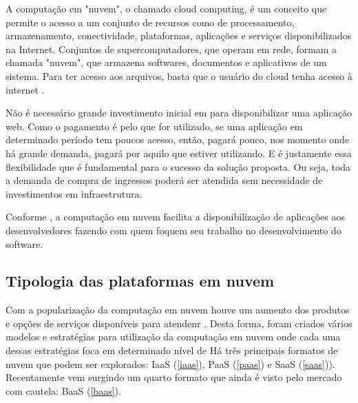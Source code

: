 \begin{citacao}
A computação em "nuvem", o chamado cloud computing, é um conceito que permite o acesso a
um conjunto de recursos como de processamento, armazenamento, conectividade, plataformas,
aplicações e serviços disponibilizados na Internet. Conjuntos de supercomputadores, que operam em
rede, formam a chamada "nuvem", que armazena softwares, documentos e aplicativos de um sistema.
Para ter acesso aos arquivos, basta que o usuário do cloud tenha acesso à internet
\cite{cloud-computing-conceitos-e-perspectivas-2012}.
\end{citacao}

Não é necessário grande investimento inicial em para disponibilizar uma aplicação web.
Como o pagamento é pelo que for utilizado, se uma aplicação em determinado período tem
poucos acesso, então, pagará pouco, nos momento onde há grande demanda, pagará por aquilo
que estiver utilizando. E é justamente essa flexibilidade que é fundamental para o sucesso
da solução proposta. Ou seja, toda a demanda de compra de ingressos poderá ser atendida
sem necessidade de investimentos em infraestrutura.

Conforme \cite{types-of-cloud-computing}, a computação em nuvem facilita a disponibilização
de aplicações aos desenvolvedores fazendo com quem foquem seu trabalho no desenvolvimento
do software.


\subsection{Tipologia das plataformas em nuvem}\label{tipologia-das-plataformas-em-nuvem}

Com a popularização da computação em nuvem houve um aumento dos produtos e opções de
serviços disponíveis para atendenr .
Desta forma, foram criados vários modelos e estratégias para
utilização da computação em nuvem onde cada uma dessas estratégias foca em determinado
nível de
Há três principais formatos de nuvem que podem ser explorados:
IaaS (\autoref{iaas}), PaaS (\autoref{paas}) e SaaS (\autoref{saas})).
Recentamente vem surgindo um quarto formato que ainda é visto pelo mercado com
cautela: BaaS (\autoref{baas}).


